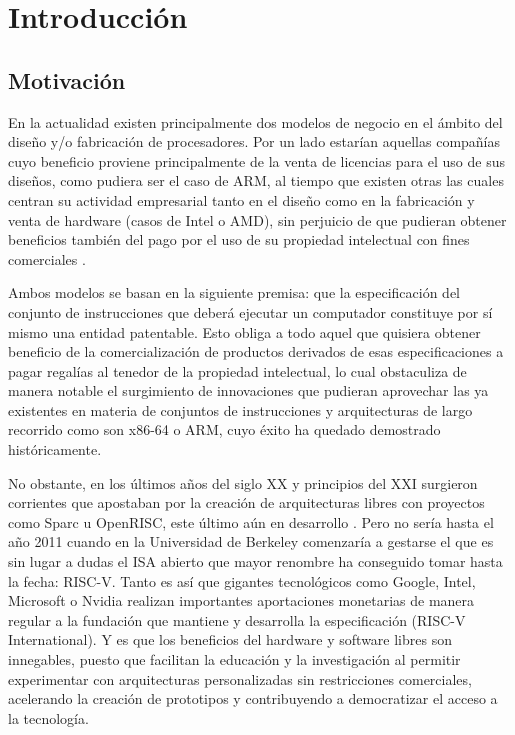 \chapter{Introducción}


\section{Motivación}

En la actualidad existen principalmente dos modelos de negocio en el ámbito del diseño y/o fabricación de procesadores. Por un lado estarían aquellas compañías cuyo beneficio proviene principalmente de la venta de licencias para el uso de sus diseños, como pudiera ser el caso de ARM, al tiempo que existen otras las cuales centran su actividad empresarial tanto en el diseño como en la fabricación y venta de hardware (casos de Intel o AMD), sin perjuicio de que pudieran obtener beneficios también del pago por el uso de su propiedad intelectual con fines comerciales \cite{asanovic2014instruction}.

Ambos modelos se basan en la siguiente premisa: que la especificación del conjunto de instrucciones que deberá ejecutar un computador constituye por sí mismo una entidad patentable. Esto obliga a todo aquel que quisiera obtener beneficio de la comercialización de productos derivados de esas especificaciones a pagar regalías al tenedor de la propiedad intelectual, lo cual obstaculiza de manera notable el surgimiento de innovaciones que pudieran aprovechar las ya existentes en materia de conjuntos de instrucciones y arquitecturas de largo recorrido como son x86-64 o ARM, cuyo éxito ha quedado demostrado históricamente.

No obstante, en los últimos años del siglo XX y principios del XXI surgieron corrientes que apostaban por la creación de arquitecturas libres con proyectos como Sparc u OpenRISC, este último aún en desarrollo \cite{openrisc}. Pero no sería hasta el año 2011 \cite{geneology} cuando en la Universidad de Berkeley comenzaría a gestarse el que es sin lugar a dudas el ISA abierto que mayor renombre ha conseguido tomar hasta la fecha: RISC-V. Tanto es así que gigantes tecnológicos como Google, Intel, Microsoft o Nvidia \cite{partners} realizan importantes aportaciones monetarias de manera regular a la fundación que mantiene y desarrolla la especificación (RISC-V International). Y es que los beneficios del hardware y software libres son innegables, puesto que facilitan la educación y la investigación al permitir experimentar con arquitecturas personalizadas sin restricciones comerciales, acelerando la creación de prototipos y contribuyendo a democratizar el acceso a la tecnología.

